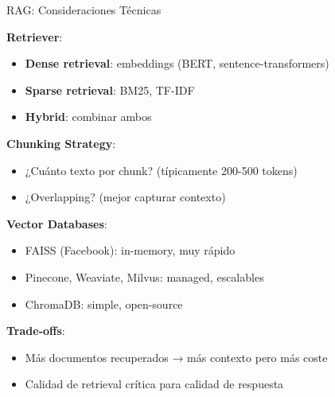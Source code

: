 \begin{frame}{RAG: Consideraciones Técnicas}

\textbf{Retriever}:
\begin{itemize}
    \item \textbf{Dense retrieval}: embeddings (BERT, sentence-transformers)
    \item \textbf{Sparse retrieval}: BM25, TF-IDF
    \item \textbf{Hybrid}: combinar ambos
\end{itemize}

\vspace{0.5em}

\textbf{Chunking Strategy}:
\begin{itemize}
    \item ¿Cuánto texto por chunk? (típicamente 200-500 tokens)
    \item ¿Overlapping? (mejor capturar contexto)
\end{itemize}

\vspace{0.5em}

\textbf{Vector Databases}:
\begin{itemize}
    \item FAISS (Facebook): in-memory, muy rápido
    \item Pinecone, Weaviate, Milvus: managed, escalables
    \item ChromaDB: simple, open-source
\end{itemize}

\vspace{0.5em}

\textbf{Trade-offs}:
\begin{itemize}
    \item Más documentos recuperados → más contexto pero más coste
    \item Calidad de retrieval crítica para calidad de respuesta
\end{itemize}

\end{frame}

